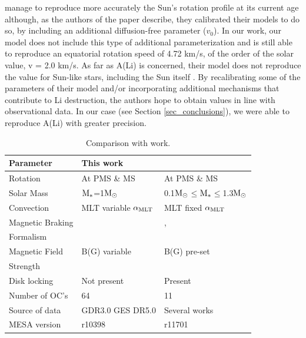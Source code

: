 \documentclass[fleqn,usenatbib]{mnras}
\begin{document}
\citet{Gossage2021} manage to reproduce more accurately the Sun's rotation profile at its current age \citep[see][panel (a) in Figures 2, 4 \& 6]{Gossage2021} although, as the authors of the paper describe, they calibrated their models to do so, by including an additional diffusion-free parameter ($v_0$). In our work, our model does not include this type of additional parameterization and is still able to reproduce an equatorial rotation speed of 4.72 km/s, of the order of the solar value, v = 2.0 km/s. As far as A(Li) is concerned, their model does not reproduce the value for Sun-like stars, including the Sun itself \citep[see][panel (d) in Figures 2 \& 4, and (b) in Figure 6]{Gossage2021}. By recalibrating some of the parameters of their model and/or incorporating additional mechanisms that contribute to Li destruction, the authors hope to obtain values in line with observational data. In our case (see Section \ref{sec_conclusions}), we were able to reproduce A(Li) with greater precision.

\begin{table}
	\centering
    \begin{threeparttable}
	\begin{tabular}{lll} 
		\hline
		Parameter & This work & \citet{Gossage2021}\\
		\hline
            
		Rotation & At PMS \& MS & At PMS \& MS\\
  		Solar Mass & $\mathrm{M}_*$=1$\mathrm{M}_\odot$ & 0.1$\mathrm{M}_\odot$$\le$$\mathrm{M}_*$$\le$1.3$\mathrm{M}_\odot$ \\
		Convection & MLT variable $\alpha_{{\rm MLT}}$ & MLT fixed $\alpha_{{\rm MLT}}$\\
		Magnetic Braking & \citet{Gallet2013} & \citet{Matt2015}, \\ Formalism & & \citet{Garraffo2018}\\
		Magnetic Field & B(G) variable & B(G) pre-set\\ Strength & & \\
            Disk locking & Not present & Present\\
            Number of OC's & 64 & 11 \\
            Source of data & GDR3.0 GES DR5.0 & Several works \\
            MESA version & r10398 & r11701\\
		\hline
	\end{tabular}
    \end{threeparttable}
	\caption{Comparison with \citet{Gossage2021} work.}\label{tab:gassage_vs_navarro}    
\end{table}
\end{document}
